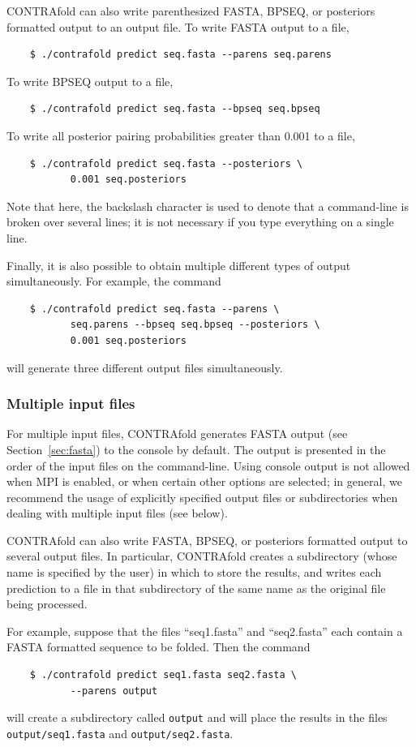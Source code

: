 \documentclass{article}
\begin{document}
  CONTRAfold can also write parenthesized FASTA, BPSEQ, or posteriors formatted
  output to an output file.  To write FASTA output to a file,
  \begin{verbatim}
    $ ./contrafold predict seq.fasta --parens seq.parens\end{verbatim}
  To write BPSEQ output to a file,
  \begin{verbatim}
    $ ./contrafold predict seq.fasta --bpseq seq.bpseq\end{verbatim}
  To write all posterior pairing probabilities greater than
  0.001 to a file, 
  \begin{verbatim}
    $ ./contrafold predict seq.fasta --posteriors \
           0.001 seq.posteriors\end{verbatim}
  Note that here, the backslash character is used to denote that a
  command-line is broken over several lines; it is not necessary if you
  type everything on a single line.

  Finally, it is also possible to obtain multiple different types of output
  simultaneously.  For example, the command
  \begin{verbatim}
    $ ./contrafold predict seq.fasta --parens \
           seq.parens --bpseq seq.bpseq --posteriors \
           0.001 seq.posteriors\end{verbatim}
  will generate three different output files simultaneously.

  \subsubsection{Multiple input files}

  For multiple input files, CONTRAfold generates FASTA
  output (see Section~\ref{sec:fasta}) to the console by default.
  The output is presented in the order of the input files on the
  command-line.  Using console output is not allowed when MPI is 
  enabled, or when certain other options are selected; in general,
  we recommend the usage of explicitly specified output files or
  subdirectories when dealing with multiple input files (see below).

  CONTRAfold can also write FASTA, BPSEQ, or posteriors formatted
  output to several output files.  In particular, CONTRAfold creates
  a subdirectory (whose name is specified by the user) in which to store
  the results, and writes each prediction to a file in that subdirectory
  of the same name as the original file being processed.  

  For example, suppose that the files ``seq1.fasta'' and ``seq2.fasta'' each
  contain a FASTA formatted sequence to be folded.  Then the command
  \begin{verbatim}
    $ ./contrafold predict seq1.fasta seq2.fasta \
           --parens output\end{verbatim}
  will create a subdirectory called \texttt{output} and will place the results 
  in the files \texttt{output/seq1.fasta} and \texttt{output/seq2.fasta}.
  
\end{document}
